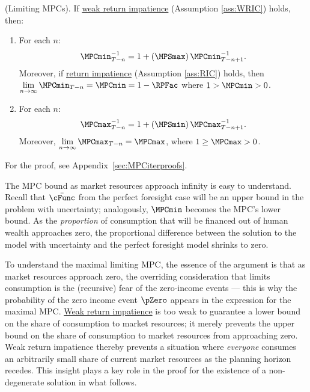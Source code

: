 \documentclass[BufferStockTheory]{subfiles}
\begin{document}
\begin{lemma}(Limiting MPCs).
\label{lemm:MPC}
If \hyperlink{WRIC}{weak return impatience} (Assumption \ref{ass:WRIC}) holds, then:

\begin{enumerate}[label=(\roman*)]
\item For each $n$:
%
\begin{equation}\label{eq:MPCminInv}
\MPCmin_{T-n}^{-1}  = 1+\left(\MPSmax\right) \MPCmin_{T-n+1}^{-1}.
\end{equation}
Moreover, if \hyperlink{RIC}{return impatience} (Assumption \ref{ass:RIC}) holds, then $\lim\limits_{n \rightarrow  \infty}\MPCmin_{T-n} = \MPCmin = 1- \RPFac$ where  $1> \MPCmin>0$.

\item  For each $n$:
\begin{equation}\label{eq:MPCmaxInv}
\MPCmax_{T-n}^{-1}   = 1+\left(\MPSmin\right) \MPCmax_{T-n+1}^{-1}.
\end{equation}
Moreover, $\lim\limits_{n \rightarrow \infty }\MPCmax_{T-n} = \MPCmax$, where $1 \geq \MPCmax > 0$.

\end{enumerate}
\end{lemma}

For the proof, see  Appendix~\ref{sec:MPCiterproofs}.


The MPC bound as market resources approach infinity is easy to understand.
Recall that $\bar{\cFunc}$ from the perfect foresight case will be an upper bound in the problem with uncertainty; analogously, $\MPCmin$ becomes the MPC's lower bound.
As the \textit{proportion} of consumption that will be financed out of human wealth approaches zero, the proportional difference between the solution to the model with uncertainty and the perfect foresight model shrinks to zero.



To understand the maximal limiting MPC, the essence of the argument is that as market resources approach zero, the overriding consideration that limits consumption is the (recursive) fear of the zero-income events --- this is why the probability of the zero income event $\pZero$ appears in the expression for the maximal MPC.
\hyperlink{WRIC}{Weak return impatience} is too weak to guarantee a lower bound on the share of consumption to market resources; it merely prevents the upper bound on the share of consumption to market resources from approaching zero.
Weak return impatience thereby prevents a situation where \textit{everyone} consumes an arbitrarily small share of current market resources as the planning horizon recedes.
This insight plays a key role in the proof for the existence of a non-degenerate solution in what follows.
\end{document}
